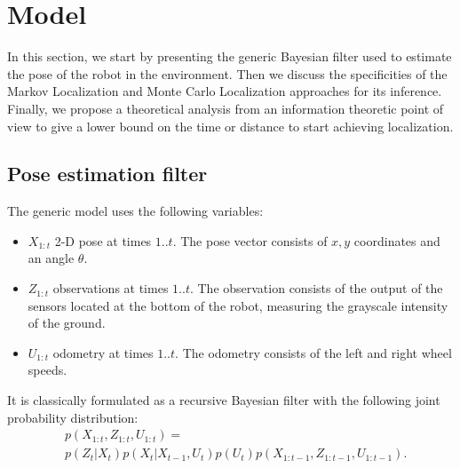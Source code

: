 \documentclass[letterpaper, 10pt, conference]{ieeeconf}
\begin{document}
\section{Model}


In this section, we start by presenting the generic Bayesian filter used to estimate the pose of the robot in the environment.
Then we discuss the specificities of the Markov Localization and Monte Carlo Localization approaches for its inference.
Finally, we propose a theoretical analysis from an information theoretic point of view to give a lower bound on the time or distance to start achieving localization.

\subsection{Pose estimation filter}

The generic model uses the following variables:
\begin{itemize}
\item $X_{1:t}$ 2-D pose at times $1..t$.
The pose vector consists of $x,y$ coordinates and an angle $\theta$.
\item $Z_{1:t}$ observations at times $1..t$.
The observation consists of the output of the sensors located at the bottom of the robot, measuring the grayscale intensity of the ground.
\item $U_{1:t}$ odometry at times $1..t$.
The odometry consists of the left and right wheel speeds.
\end{itemize}

It is classically formulated as a recursive Bayesian filter with the following joint probability distribution:
\begin{equation*}
\begin{split}
& p(X_{1:t}, Z_{1:t}, U_{1:t}) = \\
& p(Z_t|X_t) p(X_t|X_{t-1}, U_{t}) p(U_t) p(X_{1:t-1}, Z_{1:t-1}, U_{1:t-1}).
\end{split}
\end{equation*}
\end{document}
